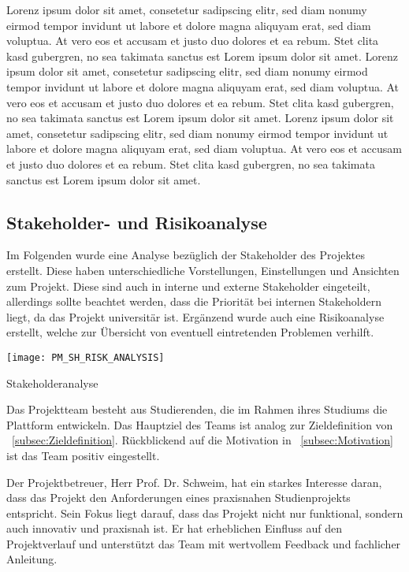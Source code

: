 Lorenz ipsum dolor sit amet, consetetur sadipscing elitr, sed diam nonumy eirmod tempor invidunt ut labore et dolore magna aliquyam erat, sed diam voluptua.
At vero eos et accusam et justo duo dolores et ea rebum.
Stet clita kasd gubergren, no sea takimata sanctus est Lorem ipsum dolor sit amet.
Lorenz ipsum dolor sit amet, consetetur sadipscing elitr, sed diam nonumy eirmod tempor invidunt ut labore et dolore magna aliquyam erat, sed diam voluptua.
At vero eos et accusam et justo duo dolores et ea rebum.
Stet clita kasd gubergren, no sea takimata sanctus est Lorem ipsum dolor sit amet.
Lorenz ipsum dolor sit amet, consetetur sadipscing elitr, sed diam nonumy eirmod tempor invidunt ut labore et dolore magna aliquyam erat, sed diam voluptua.
At vero eos et accusam et justo duo dolores et ea rebum.
Stet clita kasd gubergren, no sea takimata sanctus est Lorem ipsum dolor sit amet.

\subsection{Stakeholder- und Risikoanalyse}\label{subsec:Stakeholder-Risikoanalyse}
Im Folgenden wurde eine Analyse bezüglich der Stakeholder des Projektes erstellt.
Diese haben unterschiedliche Vorstellungen, Einstellungen und Ansichten zum Projekt.
Diese sind auch in interne und externe Stakeholder eingeteilt, allerdings sollte beachtet werden, dass die Priorität bei internen Stakeholdern liegt, da das Projekt universitär ist.
Ergänzend wurde auch eine Risikoanalyse erstellt, welche zur Übersicht von eventuell eintretenden Problemen verhilft.

    \centering
    \texttt{[image: PM\_SH\_RISK\_ANALYSIS]}
    \caption{Stakeholderanalyse}

Das Projektteam besteht aus Studierenden, die im Rahmen ihres Studiums die Plattform entwickeln.
Das Hauptziel des Teams ist analog zur Zieldefinition von ~\ref{subsec:Zieldefinition}.
Rückblickend auf die Motivation in ~\ref{subsec:Motivation} ist das Team positiv eingestellt. \par

Der Projektbetreuer, Herr Prof. Dr. Schweim, hat ein starkes Interesse daran, dass das Projekt den Anforderungen eines praxisnahen Studienprojekts entspricht.
Sein Fokus liegt darauf, dass das Projekt nicht nur funktional, sondern auch innovativ und praxisnah ist.
Er hat erheblichen Einfluss auf den Projektverlauf und unterstützt das Team mit wertvollem Feedback und fachlicher Anleitung. \par

